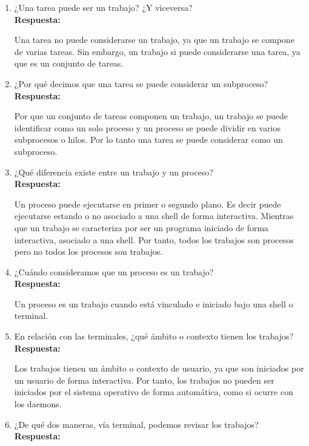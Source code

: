 \documentclass[a4paper,12pt]{article}
\begin{document}
\begin{enumerate}[label=\textbf{Pregunta \arabic*.}]
    \item ¿Una tarea puede ser un trabajo? ¿Y viceversa? \\ %
    \textbf{Respuesta:} 


    Una tarea no puede considerarse un trabajo, ya que un trabajo se compone de varias tareas. Sin embargo, un trabajo si puede considerarse una tarea, ya que es un conjunto de tareas.
    

    \item ¿Por qué decimos que una tarea se puede considerar un subproceso? \\ %
    \textbf{Respuesta:} 
    
    Por que un conjunto de tareas componen un trabajo, un trabajo se puede identificar como un solo proceso y un proceso se puede dividir en varios subprocesos o hilos. Por lo tanto una tarea se puede considerar como un subproceso.


    \item ¿Qué diferencia existe entre un trabajo y un proceso? \\ %
    \textbf{Respuesta:} 
    
    Un proceso puede ejecutarse en primer o segundo plano. Es decir puede ejecutarse estando o no asociado a una shell de forma interactiva. Mientras que un trabajo se caracteriza por ser un programa iniciado de forma interactiva, asociado a una shell. Por tanto, todos los trabajos son procesos pero no todos los procesos son trabajos.


    \item ¿Cuándo consideramos que un proceso es un trabajo? \\ %
    \textbf{Respuesta:} 
    
    Un proceso es un trabajo cuando está vinculado e iniciado bajo una shell o terminal. 


    \item En relación con las terminales, ¿qué ámbito o contexto tienen los trabajos? \\ %
    \textbf{Respuesta:} 

    Los trabajos tienen un ámbito o contexto de usuario, ya que son iniciados por un usuario de forma interactiva. Por tanto, los trabajos no pueden ser iniciados por el sistema operativo de forma automática, como si ocurre con los daemons.
    

    \item ¿De qué dos maneras, vía terminal, podemos revisar los trabajos? \\ %
    \textbf{Respuesta:} 
    

\end{enumerate}
\end{document}

